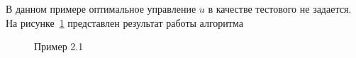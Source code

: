 \documentclass[12pt]{article}
\begin{document}
    В данном примере оптимальное управление $u$ в качестве тестового не задается.
    На рисунке~\ref{img_test_2} представлен результат работы алгоритма

    \begin{figure}[H]
        \centering
        \caption{Пример 2.1}
        \label{img_test_2}
    \end{figure}
\end{document}
